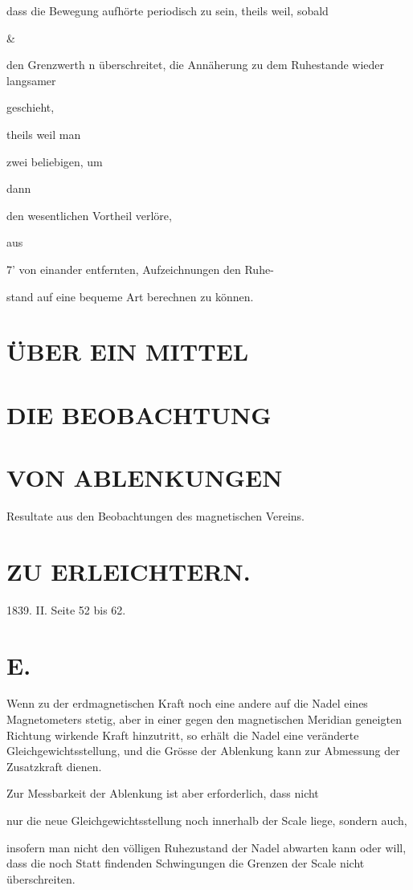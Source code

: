 \documentclass[12pt,a4paper]{article}
\begin{document}
dass die Bewegung aufhörte periodisch zu sein, theils weil, sobald

\&

den Grenzwerth n überschreitet, die Annäherung zu dem Ruhestande wieder langsamer

geschieht,

theils weil man

zwei beliebigen, um

dann

den wesentlichen Vortheil verlöre,

aus

7’ von einander entfernten, Aufzeichnungen den Ruhe-

stand auf eine bequeme Art berechnen zu können.

\section*{ÜBER EIN MITTEL}
\section*{DIE BEOBACHTUNG}
\section*{VON ABLENKUNGEN}
Resultate aus den Beobachtungen des magnetischen Vereins.

\section*{ZU ERLEICHTERN.}
1839. II. Seite 52 bis 62.

\section*{E.}
Wenn zu der erdmagnetischen Kraft noch eine andere auf die Nadel eines Magnetometers stetig, aber in einer gegen den magnetischen Meridian geneigten Richtung wirkende Kraft hinzutritt, so erhält die Nadel eine veränderte Gleichgewichtsstellung, und die Grösse der Ablenkung kann zur Abmessung der Zusatzkraft dienen.

Zur Messbarkeit der Ablenkung ist aber erforderlich, dass nicht

nur die neue Gleichgewichtsstellung noch innerhalb der Scale liege, sondern auch,

insofern man nicht den völligen Ruhezustand der Nadel abwarten kann oder will, dass die noch Statt findenden Schwingungen die Grenzen der Scale nicht überschreiten.
\end{document}
